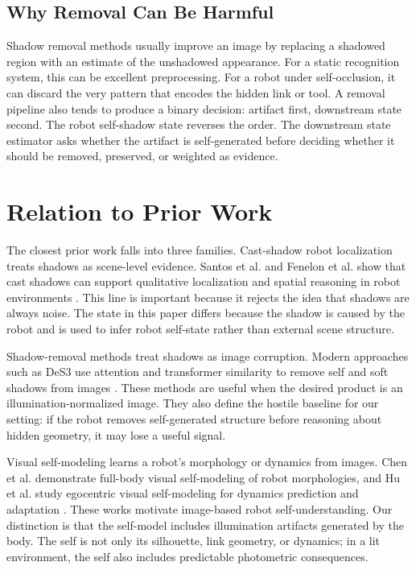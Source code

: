 \documentclass{article}
\begin{document}
\subsection{Why Removal Can Be Harmful}

Shadow removal methods usually improve an image by replacing a shadowed region with an estimate of the unshadowed appearance. For a static recognition system, this can be excellent preprocessing. For a robot under self-occlusion, it can discard the very pattern that encodes the hidden link or tool. A removal pipeline also tends to produce a binary decision: artifact first, downstream state second. The robot self-shadow state reverses the order. The downstream state estimator asks whether the artifact is self-generated before deciding whether it should be removed, preserved, or weighted as evidence.

\section{Relation to Prior Work}

The closest prior work falls into three families. Cast-shadow robot localization treats shadows as scene-level evidence. Santos et al. and Fenelon et al. show that cast shadows can support qualitative localization and spatial reasoning in robot environments \cite{santos2009qualitative,fenelon2013reasoning}. This line is important because it rejects the idea that shadows are always noise. The state in this paper differs because the shadow is caused by the robot and is used to infer robot self-state rather than external scene structure.

Shadow-removal methods treat shadows as image corruption. Modern approaches such as DeS3 use attention and transformer similarity to remove self and soft shadows from images \cite{jin2024des3}. These methods are useful when the desired product is an illumination-normalized image. They also define the hostile baseline for our setting: if the robot removes self-generated structure before reasoning about hidden geometry, it may lose a useful signal.

Visual self-modeling learns a robot's morphology or dynamics from images. Chen et al. demonstrate full-body visual self-modeling of robot morphologies, and Hu et al. study egocentric visual self-modeling for dynamics prediction and adaptation \cite{chen2022fully,hu2025egocentric}. These works motivate image-based robot self-understanding. Our distinction is that the self-model includes illumination artifacts generated by the body. The self is not only its silhouette, link geometry, or dynamics; in a lit environment, the self also includes predictable photometric consequences.
\end{document}
